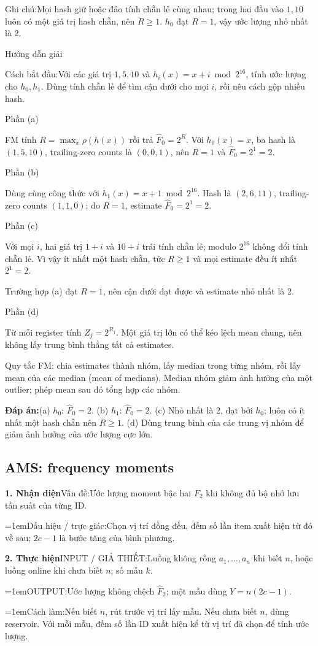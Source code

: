 \documentclass[10pt,a4paper,twocolumn]{article}
\makeatletter
\newcommand{\maptag}[1]{\phantomsection\@bsphack\protected@write\@auxout{}{\string\newlabel{#1}{{}{\thepage}{}{\@currentHref}{}}}\@esphack}
\newif\ifexamheadingprinted
\newcommand{\topic}[2]{%
  \global\examheadingprintedfalse\par\subsection{#2}\label{topic:#1}}
\newcommand{\key}[1]{#1:\enspace}
\newcommand{\solutionprompt}[1]{\par\addvspace{1pt}\noindent\key{Cách bắt đầu}#1\par\addvspace{2pt}}
\newcommand{\examnote}[1]{\par\addvspace{2pt}\noindent\key{Ghi chú}#1\par\addvspace{3pt}}
\newcommand{\blocklabel}[1]{\par\noindent#1\par\nobreak}
\newcommand{\answer}[1]{%
  \par\addvspace{3pt}%
  \blocklabel{#1Hướng dẫn giải}}
\newcommand{\finalanswer}[1]{%
  \par\addvspace{3pt}\noindent\textbf{Đáp án:}\nobreak\enspace#1\par}
\newcommand{\guidepart}[1]{%
  \par\addvspace{1.5pt}%
  \blocklabel{Phần #1}}
\newcommand{\algfield}[2]{\par\noindent\hangindent=1em\relax#1:\enspace#2}
\newcommand{\unitfield}[4]{%
  \par\noindent\textbf{#1. #2}\enspace #3:\enspace #4}
\newcommand{\algsummary}[6]{%
  \begingroup\setlength{\parskip}{1pt}%
  \unitfield{1}{Nhận diện}{Vấn đề}{#1}%
  \algfield{Dấu hiệu / trực giác}{#2}%
  \if\relax\detokenize{#3}\relax\else\par\noindent#3\par\fi%
  \unitfield{2}{Thực hiện}{INPUT / GIẢ THIẾT}{#4}%
  \algfield{OUTPUT}{#5}%
  \algfield{Cách làm}{#6}\par\endgroup}
\makeatother
\begin{document}
\examnote{Mọi hash giữ hoặc đảo tính chẵn lẻ cùng nhau; trong hai đầu vào $1,10$ luôn có một giá trị hash chẵn, nên $R\ge1$. $h_0$ đạt $R=1$, vậy ước lượng nhỏ nhất là $2$.}
\answer{\maptag{answer:P25-Q3}}
\solutionprompt{Với các giá trị $1,5,10$ và $h_i(x)=x+i\bmod2^{16}$, tính ước lượng cho $h_0,h_1$. Dùng tính chẵn lẻ để tìm cận dưới cho mọi $i$, rồi nêu cách gộp nhiều hash.}
\guidepart{(a)}
\begin{guidesteps}
\item FM tính $R=\max_x\rho(h(x))$ rồi trả $\widehat F_0=2^R$. Với $h_0(x)=x$, ba hash là $(1,5,10)$, trailing-zero counts là $(0,0,1)$, nên $R=1$ và $\widehat F_0=2^1=2$.
\end{guidesteps}
\guidepart{(b)}
\begin{guidesteps}
\item Dùng cùng công thức với $h_1(x)=x+1\bmod2^{16}$. Hash là $(2,6,11)$, trailing-zero counts $(1,1,0)$; do $R=1$, estimate $\widehat F_0=2^1=2$.
\end{guidesteps}
\guidepart{(c)}
\begin{guidesteps}
\item Với mọi $i$, hai giá trị $1+i$ và $10+i$ trái tính chẵn lẻ; modulo $2^{16}$ không đổi tính chẵn lẻ. Vì vậy ít nhất một hash chẵn, tức $R\ge1$ và mọi estimate đều ít nhất $2^1=2$.
\item Trường hợp (a) đạt $R=1$, nên cận dưới đạt được và estimate nhỏ nhất là 2.
\end{guidesteps}
\guidepart{(d)}
\begin{guidesteps}
\item Từ mỗi register tính $Z_j=2^{R_j}$. Một giá trị lớn có thể kéo lệch mean chung, nên không lấy trung bình thẳng tất cả estimates.
\item Quy tắc FM: chia estimates thành nhóm, lấy median trong từng nhóm, rồi lấy mean của các median (mean of medians). Median nhóm giảm ảnh hưởng của một outlier; phép mean sau đó tổng hợp các nhóm.
\end{guidesteps}
\finalanswer{(a) $h_0$: $\widehat F_0=2$. (b) $h_1$: $\widehat F_0=2$. (c) Nhỏ nhất là 2, đạt bởi $h_0$; luôn có ít nhất một hash chẵn nên $R\ge1$. (d) Dùng trung bình của các trung vị nhóm để giảm ảnh hưởng của ước lượng cực lớn.}
\topic{ams}{AMS: frequency moments}

\algsummary{Ước lượng moment bậc hai $F_2$ khi không đủ bộ nhớ lưu tần suất của từng ID.}{Chọn vị trí đồng đều, đếm số lần item xuất hiện từ đó về sau; $2c-1$ là bước tăng của bình phương.}{}{Luồng không rỗng $a_1,\ldots,a_n$ khi biết $n$, hoặc luồng online khi chưa biết $n$; số mẫu $k$.}{Ước lượng không chệch $\widehat F_2$; một mẫu dùng $Y=n(2c-1)$.}{Nếu biết $n$, rút trước vị trí lấy mẫu. Nếu chưa biết $n$, dùng reservoir. Với mỗi mẫu, đếm số lần ID xuất hiện kể từ vị trí đã chọn để tính ước lượng.}
\end{document}

